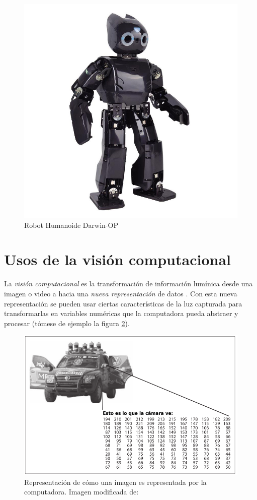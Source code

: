 \begin{figure}
\centering
\includegraphics[scale=0.25]{images/Darwin_OP.jpg}
\caption{Robot Humanoide Darwin-OP}
\label{fig:Darwin_OP}
\end{figure}

	\section{Usos de la visión computacional}
	La \textit{visión computacional} es la transformación de información lumínica desde una imagen o video a hacia una \textit{nueva representación} de datos \cite{bradski2008learning}. Con esta nueva representación se pueden usar ciertas características de la luz capturada para transformarlas en variables numéricas que la computadora pueda abstraer y procesar (tómese de ejemplo la figura \ref{fig:camera_representation}).

\begin{figure}
\centering
\includegraphics[scale=0.6]{images/new_representation_image.png}
\caption{Representación de cómo una imagen es representada por la computadora. Imagen modificada de:}
\label{fig:camera_representation}
\end{figure}

